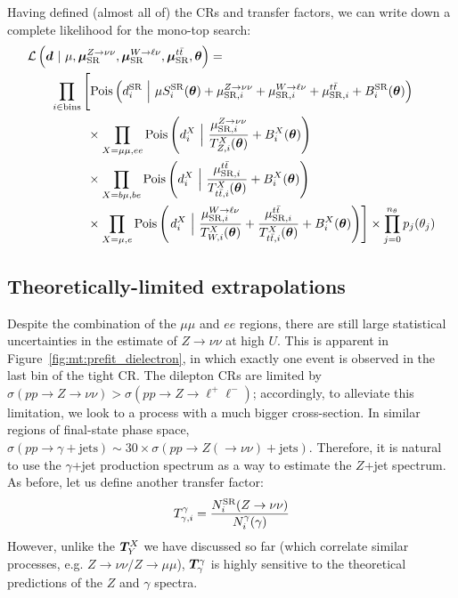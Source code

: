Having defined (almost all of) the CRs and transfer factors, we can write down a complete likelihood for the mono-top search:
\begin{align}
    \mathcal{L}\left(\bm{d}~|~ \mu,\muz,\muw,\mut,\bm{\theta}\right) = \hspace{-40mm} & \nonumber \\
    \prod_{i\in\mathrm{bins}} & \left[
    \pois\left(d^{\mathrm{SR}}_{i} ~\Big|~ \mu S^{\mathrm{SR}}_{i}(\bm\theta)  + \muzi + \muwi + \muti + B^{\mathrm{SR}}_{i}(\bm\theta)\right) \vphantom{\frac{\muzi}{\Ti{\mu\mu}{Z}(\bm\theta)}}\right. \nonumber \\
    & \phantom{\Big[} \times \prod_{X=\mu\mu,ee} \pois\left(d^{X}_i~\Big|~ \frac{\muzi}{\Ti{X}{Z}(\bm\theta)} + B^{X}_i(\bm\theta) \right) \nonumber \\
    & \phantom{\Big[} \times \prod_{X=b\mu,be}\pois\left(d^{X}_i~\Big|~ \frac{\muti}{\Ti{X}{\ttbar}(\bm\theta)} + B^{X}_i(\bm\theta) \right) \nonumber \\
    & \phantom{\Big[} \times \prod_{X=\mu,e} \pois\left(\left.d^{X}_i~\Big|~ \frac{\muwi}{\Ti{X}{W}(\bm\theta)} + \frac{\muti}{\Ti{X}{\ttbar}(\bm\theta)} + B^{X}_i(\bm\theta) \right) \right]  \times  \prod_{j=0}^{n_\theta} p_j(\theta_j)
\end{align}

\subsection{Theoretically-limited extrapolations}
\label{sec:mt:smtheory}

Despite the combination of the $\mu\mu$ and $ee$ regions, there are still large statistical uncertainties in the estimate of $Z\rightarrow\nu\nu$ at high $U$.
This is apparent in Figure~\ref{fig:mt:prefit_dielectron}, in which exactly one event is observed in the last bin of the tight CR.
The dilepton CRs are limited by $\sigma(pp\rightarrow Z\rightarrow\nu\nu) > \sigma(pp\rightarrow Z\rightarrow\ell^+\ell^-)$; accordingly, to alleviate this limitation, we look to a process with a much bigger cross-section.
In similar regions of final-state phase space, $\sigma(pp\rightarrow\gamma+\mathrm{jets}) \sim 30 \times \sigma(pp\rightarrow Z(\rightarrow\nu\nu)+\mathrm{jets})$.
Therefore, it is natural to use the $\gamma$+jet production spectrum as a way to estimate the $Z$+jet spectrum.
As before, let us define another transfer factor:
\begin{equation}
    {T}^{\gamma}_{\gamma,i} = \frac{N^\mathrm{SR}_i(Z\rightarrow\nu\nu)}{N_i^\gamma(\gamma)}
\end{equation}
However, unlike the $\bm{T}^{X}_{Y}$ we have discussed so far (which correlate similar processes, e.g. $Z\rightarrow\nu\nu/Z\rightarrow\mu\mu$), $\bm{T}^{\gamma}_{\gamma}$ is highly sensitive to the theoretical predictions of the $Z$ and $\gamma$ spectra.

